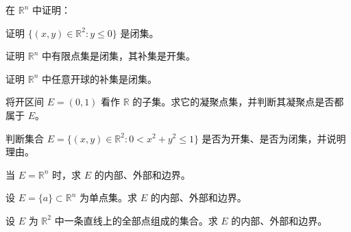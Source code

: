 \noindent\begin{minipage}{\textwidth}
在 $\mathbb R^n$ 中证明：
\end{minipage}\par\vfill
\newpage
\noindent\begin{minipage}{\textwidth}
证明 $\{(x,y)\in\mathbb R^2:y\le0\}$ 是闭集。
\end{minipage}\par\vfill
\noindent\begin{minipage}{\textwidth}
证明 $\mathbb R^n$ 中有限点集是闭集，其补集是开集。
\end{minipage}\par\vfill
\noindent\begin{minipage}{\textwidth}
证明 $\mathbb R^n$ 中任意开球的补集是闭集。
\end{minipage}\par\vfill
\newpage
\noindent\begin{minipage}{\textwidth}
将开区间 $E=(0,1)$ 看作 $\mathbb R$ 的子集。求它的凝聚点集，并判断其凝聚点是否都属于 $E$。
\end{minipage}\par\vfill
\noindent\begin{minipage}{\textwidth}
判断集合 $E=\{(x,y)\in\mathbb R^2:0<x^2+y^2\le1\}$ 是否为开集、是否为闭集，并说明理由。
\end{minipage}\par\vfill
\noindent\begin{minipage}{\textwidth}
当 $E=\mathbb R^n$ 时，求 $E$ 的内部、外部和边界。
\end{minipage}\par\vfill
\newpage
\noindent\begin{minipage}{\textwidth}
设 $E=\{a\}\subset\mathbb R^n$ 为单点集。求 $E$ 的内部、外部和边界。
\end{minipage}\par\vfill
\noindent\begin{minipage}{\textwidth}
设 $E$ 为 $\mathbb R^2$ 中一条直线上的全部点组成的集合。求 $E$ 的内部、外部和边界。
\end{minipage}\par\vfill
